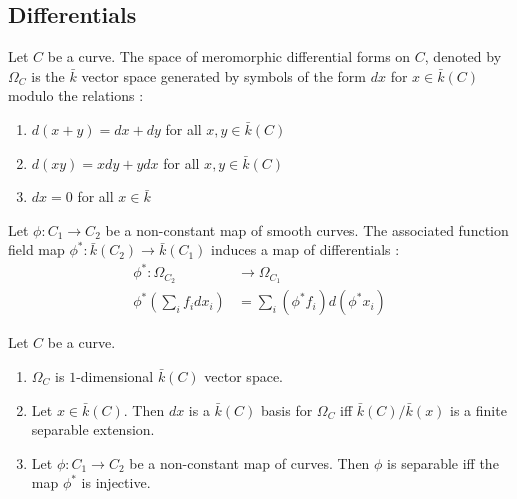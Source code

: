 \documentclass[oneside, 12pt]{scrbook}
\theoremstyle{theorem}
\begin{document}
\subsection{Differentials}

\begin{definition}
Let $C$ be a curve. The space of meromorphic differential forms on $C$, denoted by $\Omega_{C}$ is the $\bar{k}$ vector space generated by symbols of the form $dx$ for $x \in \bar{k}(C)$ modulo the relations : 
\begin{enumerate}
\item $d(x+y) = dx + dy$ for all $x,y \in \bar{k}(C)$
\item $d(xy) = xdy + ydx$ for all $x,y \in \bar{k}(C)$
\item $dx=0$ for all $x \in \bar{k}$
\end{enumerate}  
\end{definition}

Let $\phi : C_{1} \rightarrow C_{2}$ be a non-constant map of smooth curves. The associated function field map $\phi^* : \bar{k}(C_{2}) \rightarrow \bar{k}(C_{1})$ induces a map of differentials : 
\begin{align*}
\phi^* : \Omega_{C_{2}} &\rightarrow \Omega_{C_{1}} \\ \phi^* \left( \sum_{i} f_{i} dx_{i} \right) &= \sum_{i} (\phi^* f_{i}) d(\phi^* x_{i})
\end{align*}

\begin{proposition}
Let $C$ be a curve. 
\begin{enumerate}
\item $\Omega_{C}$ is $1$-dimensional $\bar{k}(C)$ vector space. 
\item Let $x\in \bar{k}(C)$. Then $dx$ is a $\bar{k}(C)$ basis for $\Omega_{C}$ iff $\bar{k}(C)/ \bar{k}(x)$ is a finite separable extension.
\item Let $\phi: C_{1} \rightarrow C_{2}$ be a non-constant map of curves. Then $\phi$ is separable iff the map $\phi^*$ is injective. 
\end{enumerate}
\end{proposition}
\end{document}
